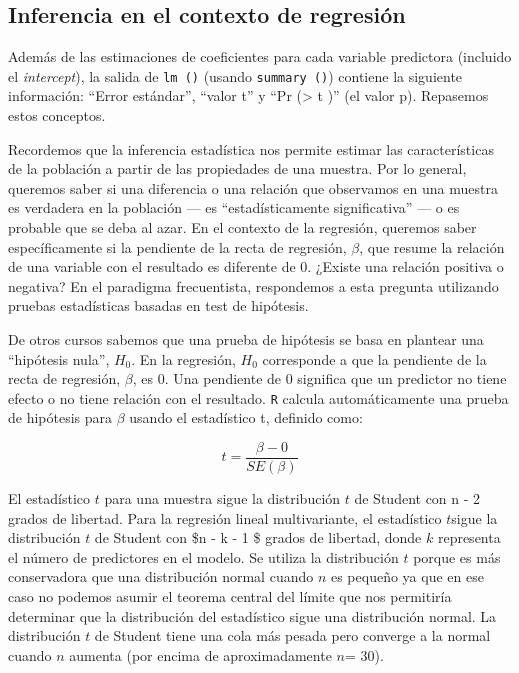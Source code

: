\documentclass[
]{book}
\begin{document}
\hypertarget{inferencia-en-el-contexto-de-regresiuxf3n}{%
\subsection{Inferencia en el contexto de regresión}\label{inferencia-en-el-contexto-de-regresiuxf3n}}

Además de las estimaciones de coeficientes para cada variable predictora (incluido el \emph{intercept}), la salida de \texttt{lm\ ()} (usando \texttt{summary\ ()}) contiene la siguiente información: ``Error estándar'', ``valor t'' y ``Pr (\textgreater{} \textbar{} t \textbar)'' (el valor p). Repasemos estos conceptos.

Recordemos que la inferencia estadística nos permite estimar las características de la población a partir de las propiedades de una muestra. Por lo general, queremos saber si una diferencia o una relación que observamos en una muestra es verdadera en la población --- es ``estadísticamente significativa'' --- o es probable que se deba al azar. En el contexto de la regresión, queremos saber específicamente si la pendiente de la recta de regresión, \(\beta\), que resume la relación de una variable con el resultado es diferente de 0. ¿Existe una relación positiva o negativa? En el paradigma frecuentista, respondemos a esta pregunta utilizando pruebas estadísticas basadas en test de hipótesis.

De otros cursos sabemos que una prueba de hipótesis se basa en plantear una ``hipótesis nula'', \(H_0\). En la regresión, \(H_0\) corresponde a que la pendiente de la recta de regresión, \(\beta\), es 0. Una pendiente de 0 significa que un predictor no tiene efecto o no tiene relación con el resultado. \texttt{R} calcula automáticamente una prueba de hipótesis para \(\beta\) usando el estadístico t, definido como:

\[
t = \frac {\beta - 0} {SE (\beta)}
\]

El estadístico \(t\) para una muestra sigue la distribución \(t\) de Student con n - 2 grados de libertad. Para la regresión lineal multivariante, el estadístico \(t\)sigue la distribución \(t\) de Student con \$n - k - 1 \$ grados de libertad, donde \(k\) representa el número de predictores en el modelo. Se utiliza la distribución \(t\) porque es más conservadora que una distribución normal cuando \(n\) es pequeño ya que en ese caso no podemos asumir el teorema central del límite que nos permitiría determinar que la distribución del estadístico sigue una distribución normal. La distribución \(t\) de Student tiene una cola más pesada pero converge a la normal cuando \(n\) aumenta (por encima de aproximadamente \(n\)= 30).
\end{document}
